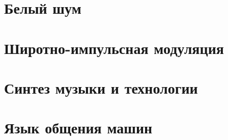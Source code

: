\documentclass[a4paper,twoside]{book}
\begin{document}
\chapter{Белый шум}







\chapter{Широтно-импульсная модуляция}
\label{chapter:pwm}






\chapter{Синтез музыки и технологии}

















\chapter{Язык общения машин}



\end{document}
